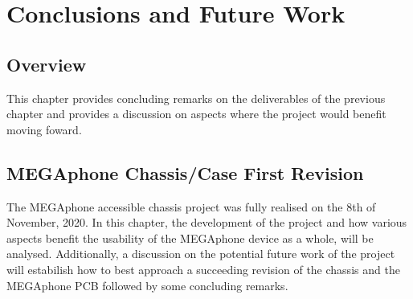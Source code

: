 
\chapter{Conclusions and Future Work} %

\label{Chapter5} %


\section{Overview}
This chapter provides concluding remarks on the deliverables of the previous chapter and provides a discussion on aspects where the project would benefit moving foward.


\section{MEGAphone Chassis/Case First Revision}
The MEGAphone accessible chassis project was fully realised on the 8th of November, 2020. 
In this chapter, the development of the project and how various aspects benefit the usability of the MEGAphone device as a whole, will be analysed. %
Additionally, a discussion on the potential future work of the project will estabilish how to best approach a succeeding revision of the chassis and the MEGAphone PCB followed by some concluding remarks. \newline

